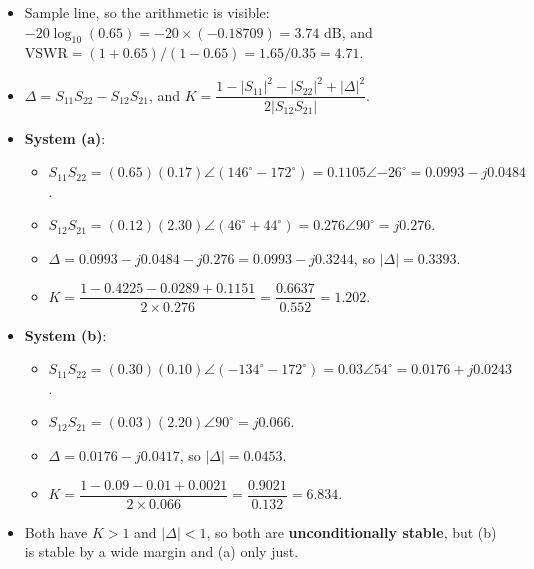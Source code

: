 \vspace{2pt}
\begin{itemize}
  \item Sample line, so the arithmetic is visible:
    $-20\log_{10}(0.65) = -20 \times (-0.18709) = 3.74$ dB, and
    $\text{VSWR} = (1+0.65)/(1-0.65) = 1.65/0.35 = 4.71$.
\end{itemize}
\begin{itemize}
  \item $\Delta = S_{11}S_{22} - S_{12}S_{21}$, and
    $K = \dfrac{1 - |S_{11}|^2 - |S_{22}|^2 + |\Delta|^2}{2|S_{12}S_{21}|}$.
  \item \textbf{System (a)}:
  \begin{itemize}
    \item $S_{11}S_{22} = (0.65)(0.17)\angle(146^\circ - 172^\circ)
      = 0.1105\angle{-26^\circ} = 0.0993 - j0.0484$.
    \item $S_{12}S_{21} = (0.12)(2.30)\angle(46^\circ + 44^\circ)
      = 0.276\angle90^\circ = j0.276$.
    \item $\Delta = 0.0993 - j0.0484 - j0.276 = 0.0993 - j0.3244$, so
      $|\Delta| = 0.3393$.
    \item $K = \dfrac{1 - 0.4225 - 0.0289 + 0.1151}{2 \times 0.276}
      = \dfrac{0.6637}{0.552} = 1.202$.
  \end{itemize}
  \item \textbf{System (b)}:
  \begin{itemize}
    \item $S_{11}S_{22} = (0.30)(0.10)\angle(-134^\circ - 172^\circ)
      = 0.03\angle54^\circ = 0.0176 + j0.0243$.
    \item $S_{12}S_{21} = (0.03)(2.20)\angle90^\circ = j0.066$.
    \item $\Delta = 0.0176 - j0.0417$, so $|\Delta| = 0.0453$.
    \item $K = \dfrac{1 - 0.09 - 0.01 + 0.0021}{2 \times 0.066}
      = \dfrac{0.9021}{0.132} = 6.834$.
  \end{itemize}
  \item Both have $K > 1$ and $|\Delta| < 1$, so both are \textbf{unconditionally
    stable}, but (b) is stable by a wide margin and (a) only just.
\end{itemize}
